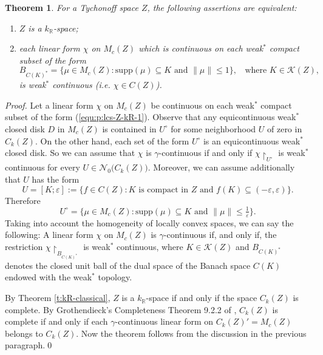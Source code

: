\documentclass[preprint,11pt]{elsarticle}
\newtheorem{theorem}{Theorem}[section]
\numberwithin{equation}{section}
\numberwithin{theorem}{section}
\newcommand{\e}{\varepsilon}
\newcommand{\IR}{\mathbb{R}}
\newcommand{\KK}{\mathcal{K}}
\newcommand{\Nn}{\mathcal{N}}
\newcommand{\supp}{\mathrm{supp}}
\newcommand{\CC}{C_k}
\begin{document}
\begin{theorem} \label{t:lcs-Z-kR}
For a Tychonoff space $Z$, the following assertions are equivalent:
\begin{enumerate}
\item[{\rm(i)}] $Z$ is a $k_\IR$-space;
\item[{\rm(ii)}] each linear form $\chi$ on $M_c(Z)$ which is continuous on each weak$^\ast$ compact subset of the form
\begin{equation} \label{equ:p:lcs-Z-kR-1}
B_{C(K)^\ast}= \{\mu\in M_c(Z): \supp(\mu)\subseteq K \mbox{ and } \|\mu\|\leq 1\}, \;\; \mbox{ where $K\in \KK(Z)$, }
\end{equation}
 is weak$^\ast$ continuous {\rm(}i.e. $\chi\in C(Z)${\rm)}.
\end{enumerate}
\end{theorem}


\begin{proof}
Let a linear form $\chi$ on $M_c(Z)$ be continuous on each weak$^\ast$ compact subset of the form (\ref{equ:p:lcs-Z-kR-1}). Observe that any  equicontinuous weak$^\ast$  closed disk $D$ in $M_c(Z)$ is contained in $U^\circ$ for some neighborhood $U$ of zero in $\CC(Z)$. On the other hand, each set of the form  $U^\circ$ is an equicontinuous weak$^\ast$  closed disk. So we can assume that $\chi$ is $\gamma$-continuous if and only if  $\chi{\restriction}_{U^\circ}$ is weak$^\ast$ continuous for every $U\in \Nn_0\big(\CC(Z)\big)$. Moreover, we can assume additionally that $U$ has the form
\[
U=[K;\e] :=\{ f\in C(Z): K \mbox{ is compact in $Z$ and } f(K)\subseteq (-\e,\e)\big\}.
\]
Therefore
\[
U^\circ=\{ \mu\in M_c(Z): \supp(\mu)\subseteq K \mbox{ and } \|\mu\|\leq \tfrac{1}{\e}\big\}.
\]
Taking into account the homogeneity of locally convex spaces, we can say the following: A  linear form $\chi$ on $M_c(Z)$ is $\gamma$-continuous if, and only if, the restriction $\chi{\restriction}_{B_{C(K)^\ast}}$ is weak$^\ast$ continuous, where $K\in\KK(Z)$ and  $B_{C(K)^\ast}$ denotes the closed unit ball of the dual space of the Banach space $C(K)$ endowed with the weak$^\ast$ topology.


By Theorem \ref{t:kR-classical},  $Z$ is a $k_\IR$-space if and only if the space $\CC(Z)$ is complete. By Grothendieck's Completeness Theorem 9.2.2 of \cite{Jar}, $\CC(Z)$ is complete if and only if each $\gamma$-continuous linear form on $\CC(Z)'=M_c(Z)$ belongs to $\CC(Z)$. Now the theorem follows from the discussion in the previous paragraph.\qed
\end{proof}
\end{document}
